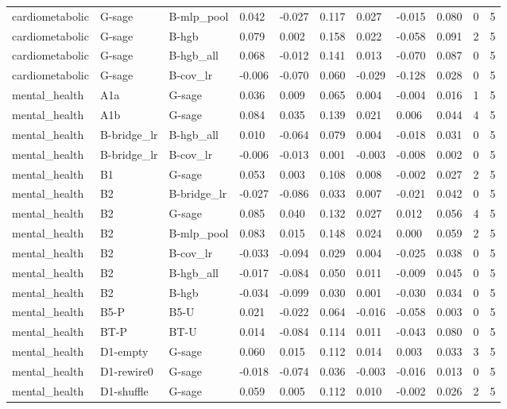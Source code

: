 \begin{table}[t]
\begin{tabular}{lllllllllll}
cardiometabolic & G-sage & B-mlp\_pool & 0.042 & -0.027 & 0.117 & 0.027 & -0.015 & 0.080 & 0 & 5 \\
cardiometabolic & G-sage & B-hgb & 0.079 & 0.002 & 0.158 & 0.022 & -0.058 & 0.091 & 2 & 5 \\
cardiometabolic & G-sage & B-hgb\_all & 0.068 & -0.012 & 0.141 & 0.013 & -0.070 & 0.087 & 0 & 5 \\
cardiometabolic & G-sage & B-cov\_lr & -0.006 & -0.070 & 0.060 & -0.029 & -0.128 & 0.028 & 0 & 5 \\
mental\_health & A1a & G-sage & 0.036 & 0.009 & 0.065 & 0.004 & -0.004 & 0.016 & 1 & 5 \\
mental\_health & A1b & G-sage & 0.084 & 0.035 & 0.139 & 0.021 & 0.006 & 0.044 & 4 & 5 \\
mental\_health & B-bridge\_lr & B-hgb\_all & 0.010 & -0.064 & 0.079 & 0.004 & -0.018 & 0.031 & 0 & 5 \\
mental\_health & B-bridge\_lr & B-cov\_lr & -0.006 & -0.013 & 0.001 & -0.003 & -0.008 & 0.002 & 0 & 5 \\
mental\_health & B1 & G-sage & 0.053 & 0.003 & 0.108 & 0.008 & -0.002 & 0.027 & 2 & 5 \\
mental\_health & B2 & B-bridge\_lr & -0.027 & -0.086 & 0.033 & 0.007 & -0.021 & 0.042 & 0 & 5 \\
mental\_health & B2 & G-sage & 0.085 & 0.040 & 0.132 & 0.027 & 0.012 & 0.056 & 4 & 5 \\
mental\_health & B2 & B-mlp\_pool & 0.083 & 0.015 & 0.148 & 0.024 & 0.000 & 0.059 & 2 & 5 \\
mental\_health & B2 & B-cov\_lr & -0.033 & -0.094 & 0.029 & 0.004 & -0.025 & 0.038 & 0 & 5 \\
mental\_health & B2 & B-hgb\_all & -0.017 & -0.084 & 0.050 & 0.011 & -0.009 & 0.045 & 0 & 5 \\
mental\_health & B2 & B-hgb & -0.034 & -0.099 & 0.030 & 0.001 & -0.030 & 0.034 & 0 & 5 \\
mental\_health & B5-P & B5-U & 0.021 & -0.022 & 0.064 & -0.016 & -0.058 & 0.003 & 0 & 5 \\
mental\_health & BT-P & BT-U & 0.014 & -0.084 & 0.114 & 0.011 & -0.043 & 0.080 & 0 & 5 \\
mental\_health & D1-empty & G-sage & 0.060 & 0.015 & 0.112 & 0.014 & 0.003 & 0.033 & 3 & 5 \\
mental\_health & D1-rewire0 & G-sage & -0.018 & -0.074 & 0.036 & -0.003 & -0.016 & 0.013 & 0 & 5 \\
mental\_health & D1-shuffle & G-sage & 0.059 & 0.005 & 0.112 & 0.010 & -0.002 & 0.026 & 2 & 5 \\

\end{tabular}
\end{table}
